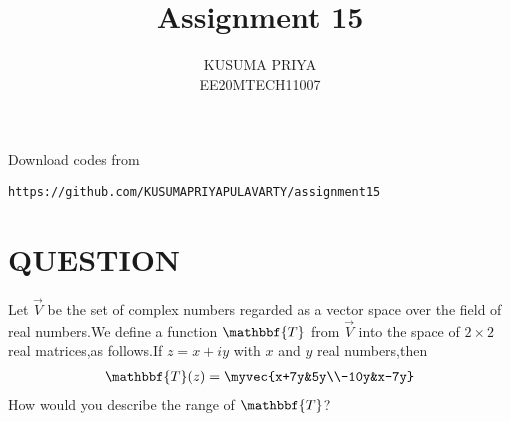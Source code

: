 \documentclass[journal,12pt,twocolumn]{IEEEtran}
\begin{document}
\renewcommand{\thefigure}{\theproblem}

\def\putbox#1#2#3{\makebox[0in][l]{\makebox[#1][l]{}\raisebox{\baselineskip}[0in][0in]{\raisebox{#2}[0in][0in]{#3}}}}
     \def\rightbox#1{\makebox[0in][r]{#1}}
     \def\centbox#1{\makebox[0in]{#1}}
     \def\topbox#1{\raisebox{-\baselineskip}[0in][0in]{#1}}
     \def\midbox#1{\raisebox{-0.5\baselineskip}[0in][0in]{#1}}
\vspace{3cm}
\title{Assignment 15}
\author{KUSUMA PRIYA\\EE20MTECH11007}

\maketitle
\newpage

\bigskip
\renewcommand{\thefigure}{\theenumi}
\renewcommand{\thetable}{\theenumi}
Download codes from 
%
\begin{lstlisting}
https://github.com/KUSUMAPRIYAPULAVARTY/assignment15
\end{lstlisting}
%
 
 \section{QUESTION}
Let $\vec{V}$ be the set of complex numbers regarded as a vector space over the field of real numbers.We define a function $\mathbbf{T}$ from $\vec{V}$ into the space of $2 \times 2$ real matrices,as follows.If $z=x+i y$ with $x$ and $y$ real numbers,then 
\begin{align}
\mathbbf{T}(z)=\myvec{x+7y&5y\\-10y&x-7y}
\end{align}
How would you describe the range of $\mathbbf{T}$?
%
\end{document}
